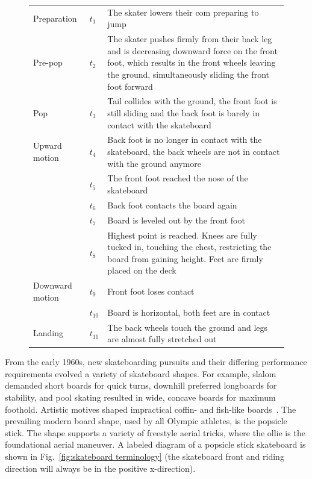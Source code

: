 \documentclass[default,iicol]{sn-jnl}
\begin{document}
\begin{figure}[!t]
{    \begin{center}
    \begin{tabular}{p{1.6cm} p{0.3cm} p{12.7cm}}
        Preparation     & $t_1$ & The skater lowers their \gls{com} preparing to jump \\
        Pre-pop         & $t_2$ & The skater pushes firmly from their back leg and is decreasing downward force on the front foot, which results in the front wheels leaving the ground, simultaneously sliding the front foot forward \\
        Pop             & $t_3$ & Tail collides with the ground, the front foot is still sliding and the back foot is barely in contact with the skateboard~\cite{determan_kinetics_2006,nakashima_simulation_2021} \\
        Upward motion   & $t_4$ & Back foot is no longer in contact with the skateboard, the back wheels are not in contact with the ground anymore~\cite{determan_kinetics_2006,nakashima_simulation_2021} \\
                        & $t_5$ & The front foot reached the nose of the skateboard \\
                        & $t_6$ & Back foot contacts the board again \\
                        & $t_7$ & Board is leveled out by the front foot \\
                        & $t_8$ & Highest point is reached. Knees are fully tucked in, touching the chest, restricting the board from gaining height. Feet are firmly placed on the deck \\
        Downward motion & $t_9$ & Front foot loses contact \\
                        & $t_{10}$& Board is horizontal, both feet are in contact \\
        Landing         & $t_{11}$& The back wheels touch the ground and legs are almost fully stretched out \\
    \end{tabular}
    \end{center}
}
  \label{fig:ollie steps}
\end{figure}

From the early 1960s, new skateboarding pursuits and their differing performance requirements evolved a variety of skateboard shapes.
For example, slalom demanded short boards for quick turns, downhill preferred longboards for stability, and pool skating resulted in wide, concave boards for maximum foothold. 
Artistic motives shaped impractical coffin- and
fish-like boards~\cite{prentiss_get_2011}.
The prevailing modern board shape, used by all Olympic athletes, is the popsicle stick.
The shape supports a variety of freestyle aerial tricks, where the ollie is the foundational aerial maneuver.
A labeled diagram of a popsicle stick skateboard is shown in Fig.~\ref{fig:skateboard terminology} (the skateboard front and riding direction will always be in the positive x-direction).
\end{document}
